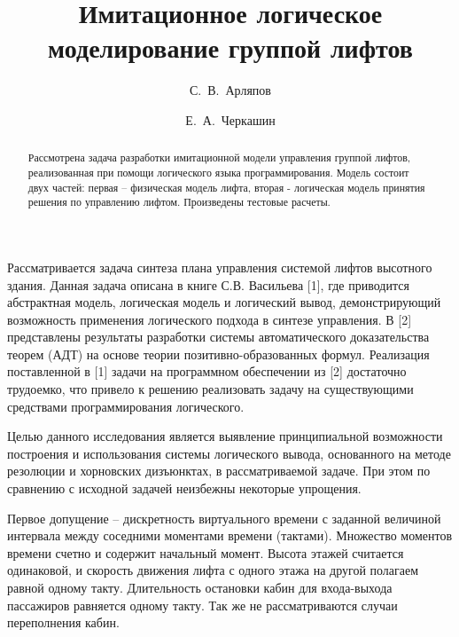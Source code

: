 \title{Имитационное логическое моделирование группой лифтов}

\author{%
С.~В.~Арляпов
  \and
  Е.~А.~Черкашин
}


\maketitle

\begin{abstract}
Рассмотрена задача разработки имитационной модели управления группой лифтов, реализованная при помощи логического языка программирования. Модель состоит двух частей: первая -- физическая модель лифта, вторая - логическая модель принятия решения по управлению лифтом. Произведены тестовые расчеты.

\end{abstract}

Рассматривается задача синтеза плана управления системой лифтов высотного здания. Данная задача описана в книге С.В. Васильева [1], где приводится абстрактная модель, логическая модель и логический вывод, демонстрирующий возможность применения логического подхода в синтезе управления. В [2] представлены результаты разработки системы автоматического доказательства теорем (АДТ) на основе теории позитивно-образованных формул. Реализация поставленной в [1] задачи на программном обеспечении из [2] достаточно трудоемко, что привело к решению реализовать задачу на существующими средствами программирования логического.

Целью данного исследования является выявление принципиальной возможности построения и использования системы логического вывода, основанного на методе резолюции и хорновских дизъюнктах, в рассматриваемой задаче. При этом по сравнению с исходной задачей неизбежны некоторые упрощения.

Первое допущение -- дискретность виртуального времени с заданной величиной интервала между соседними моментами времени (тактами). Множество моментов времени счетно и содержит начальный момент. Высота этажей считается одинаковой, и скорость движения лифта с одного этажа на другой полагаем равной одному такту. Длительность остановки кабин для входа-выхода пассажиров равняется одному такту.  Так же не рассматриваются случаи переполнения кабин.

